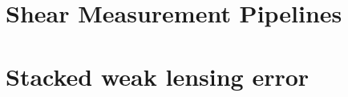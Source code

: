 \documentclass[useAMS,usenatbib]{mn2e}
\begin{document}



\appendix
\onecolumn

%

\section{Shear Measurement Pipelines}\label{App:shpipe}


\section{Stacked weak lensing error}\label{App:statsec_a}


\label{lastpage}
\end{document}
